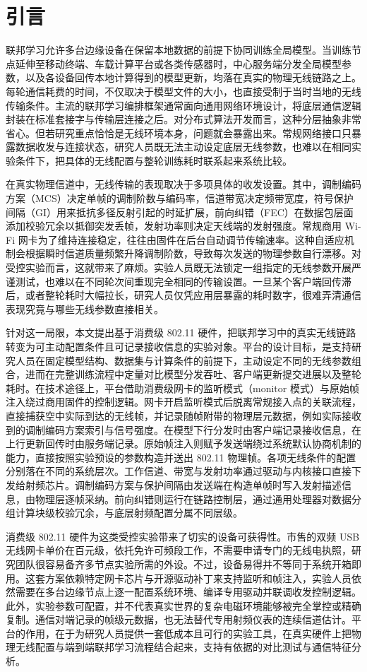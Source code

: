 \section{引言}
\label{sec:1}

联邦学习允许多台边缘设备在保留本地数据的前提下协同训练全局模型。当训练节点延伸至移动终端、车载计算平台或各类传感器时，中心服务端分发全局模型参数，以及各设备回传本地计算得到的模型更新，均落在真实的物理无线链路之上。每轮通信耗费的时间，不仅取决于模型文件的大小，也直接受制于当时当地的无线传输条件。主流的联邦学习编排框架通常面向通用网络环境设计，将底层通信逻辑封装在标准套接字与传输层连接之后。对分布式算法开发而言，这种分层抽象非常省心。但若研究重点恰恰是无线环境本身，问题就会暴露出来。常规网络接口只暴露数据收发与连接状态，研究人员既无法主动设定底层无线参数，也难以在相同实验条件下，把具体的无线配置与整轮训练耗时联系起来系统比较。

在真实物理信道中，无线传输的表现取决于多项具体的收发设置。其中，调制编码方案（MCS）决定单帧的调制阶数与编码率，信道带宽决定频带宽度，符号保护间隔（GI）用来抵抗多径反射引起的时延扩展，前向纠错（FEC）在数据包层面添加校验冗余以抵御突发丢帧，发射功率则决定天线端的发射强度。常规商用 Wi-Fi 网卡为了维持连接稳定，往往由固件在后台自动调节传输速率。这种自适应机制会根据瞬时信道质量频繁升降调制阶数，导致每次发送的物理参数自行漂移。对受控实验而言，这就带来了麻烦。实验人员既无法锁定一组指定的无线参数开展严谨测试，也难以在不同轮次间重现完全相同的传输设置。一旦某个客户端回传滞后，或者整轮耗时大幅拉长，研究人员仅凭应用层暴露的耗时数字，很难弄清通信表现究竟与哪些无线参数直接相关。

针对这一局限，本文提出基于消费级 802.11 硬件，把联邦学习中的真实无线链路转变为可主动配置条件且可记录接收信息的实验对象。平台的设计目标，是支持研究人员在固定模型结构、数据集与计算条件的前提下，主动设定不同的无线参数组合，进而在完整训练流程中定量对比模型分发吞吐、客户端更新提交进展以及整轮耗时。在技术途径上，平台借助消费级网卡的监听模式（monitor 模式）与原始帧注入绕过商用固件的控制逻辑。网卡开启监听模式后脱离常规接入点的关联流程，直接捕获空中实际到达的无线帧，并记录随帧附带的物理层元数据，例如实际接收到的调制编码方案索引与信号强度。在模型下行分发时由客户端记录接收信息，在上行更新回传时由服务端记录。原始帧注入则赋予发送端绕过系统默认协商机制的能力，直接按照实验预设的参数构造并送出 802.11 物理帧。各项无线条件的配置分别落在不同的系统层次。工作信道、带宽与发射功率通过驱动与内核接口直接下发给射频芯片。调制编码方案与保护间隔由发送端在构造单帧时写入发射描述信息，由物理层逐帧采纳。前向纠错则运行在链路控制层，通过通用处理器对数据分组计算块级校验冗余，与底层射频配置分属不同层级。

消费级 802.11 硬件为这类受控实验带来了切实的设备可获得性。市售的双频 USB 无线网卡单价在百元级，依托免许可频段工作，不需要申请专门的无线电执照，研究团队很容易备齐多节点实验所需的外设。不过，设备易得并不等同于系统开箱即用。这套方案依赖特定网卡芯片与开源驱动补丁来支持监听和帧注入，实验人员依然需要在多台边缘节点上逐一配置系统环境、编译专用驱动并联调收发控制逻辑。此外，实验参数可配置，并不代表真实世界的复杂电磁环境能够被完全掌控或精确复制。通信对端记录的帧级元数据，也无法替代专用射频仪表的连续信道估计。平台的作用，在于为研究人员提供一套低成本且可行的实验工具，在真实硬件上把物理无线配置与端到端联邦学习流程结合起来，支持有依据的对比测试与通信特征分析。
